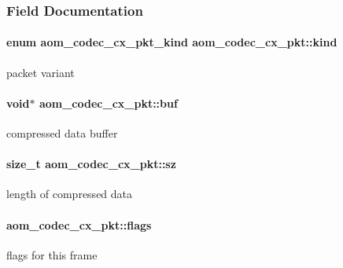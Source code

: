 \subsubsection{Field Documentation}
\paragraph[{\texorpdfstring{kind}{kind}}]{\setlength{\rightskip}{0pt plus 5cm}enum {\bf aom\+\_\+codec\+\_\+cx\+\_\+pkt\+\_\+kind} aom\+\_\+codec\+\_\+cx\+\_\+pkt\+::kind}\hypertarget{structaom__codec__cx__pkt_a11e586120c689ece9a7690e72ff384be}{}\label{structaom__codec__cx__pkt_a11e586120c689ece9a7690e72ff384be}
packet variant 
\paragraph[{\texorpdfstring{buf}{buf}}]{\setlength{\rightskip}{0pt plus 5cm}void$\ast$ aom\+\_\+codec\+\_\+cx\+\_\+pkt\+::buf}\hypertarget{structaom__codec__cx__pkt_ae7f651df762a1f26529a1e9482b6ab7a}{}\label{structaom__codec__cx__pkt_ae7f651df762a1f26529a1e9482b6ab7a}
compressed data buffer 
\paragraph[{\texorpdfstring{sz}{sz}}]{\setlength{\rightskip}{0pt plus 5cm}size\+\_\+t aom\+\_\+codec\+\_\+cx\+\_\+pkt\+::sz}\hypertarget{structaom__codec__cx__pkt_a08d19fa7a14be2767d9578f5cca5631e}{}\label{structaom__codec__cx__pkt_a08d19fa7a14be2767d9578f5cca5631e}
length of compressed data 
\paragraph[{\texorpdfstring{flags}{flags}}]{ aom\+\_\+codec\+\_\+cx\+\_\+pkt\+::flags}\hypertarget{structaom__codec__cx__pkt_a9b064c19b81195c081af90e93879dec0}{}\label{structaom__codec__cx__pkt_a9b064c19b81195c081af90e93879dec0}
flags for this frame 
